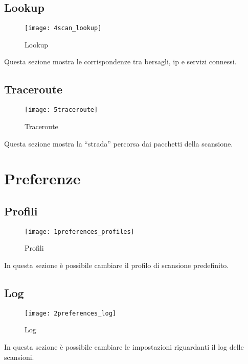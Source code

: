 \section{Lookup}
\label{sec:Lookup}

\begin{figure}[h]
  \centering
  \texttt{[image: 4scan\_lookup]}
  \caption{Lookup}
  \label{fig:Lookup}
\end{figure}
Questa sezione mostra le corrispondenze tra bersagli, ip e servizi connessi.

\section{Traceroute}
\label{sec:Traceroute}

\begin{figure}[h]
  \centering
  \texttt{[image: 5traceroute]}
  \caption{Traceroute}
  \label{fig:Traceroute}
\end{figure}
Questa sezione mostra la ``strada'' percorsa dai pacchetti della scansione.

\chapter{Preferenze}
\label{ch:Preferences}

\section{Profili}
\label{sec:profiles}

\begin{figure}[h]
  \centering
  \texttt{[image: 1preferences\_profiles]}
  \caption{Profili}
  \label{fig:Profili}
\end{figure}
In questa sezione \`e possibile cambiare il profilo di scansione predefinito.

\section{Log}
\label{sec:Log}

\begin{figure}[h]
  \centering
  \texttt{[image: 2preferences\_log]}
  \caption{Log}
  \label{fig:Log}
\end{figure}
In questa sezione \`e possibile cambiare le impostazioni riguardanti il log 
delle scansioni.

